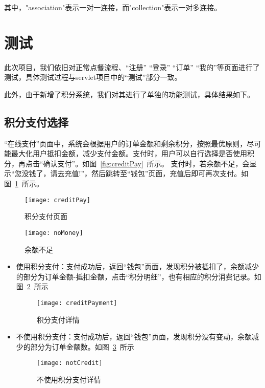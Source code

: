 其中，"association"表示一对一连接，而"collection"表示一对多连接。

\section{测试}
此次项目，我们依旧对正常点餐流程、“注册” “登录” “订单” “我的”等页面进行了测试，具体测试过程与servlet项目中的“测试”部分一致。

此外，由于新增了积分系统，我们对其进行了单独的功能测试，具体结果如下。~\\
\subsection{积分支付选择}
“在线支付”页面中，系统会根据用户的订单金额和剩余积分，按照最优原则，尽可能最大化用户抵扣金额，减少支付金额。支付时，用户可以自行选择是否使用积分，再点击“确认支付”。如图~\ref{fig:creditPay}~所示。
支付时，若余额不足，会显示“您没钱了，请去充值!”，然后跳转至“钱包”页面，充值后即可再次支付。如图~\ref{fig:noMoney}~所示。~\\
\begin{figure}[htbp]
    \centering
    \begin{minipage}{0.4\textwidth}
        \centering
        \texttt{[image: creditPay]}
        \caption{积分支付页面}\label{fig:creditPay}
    \end{minipage}
    \begin{minipage}{0.4\textwidth}
        \centering
        \texttt{[image: noMoney]}
        \caption{余额不足}\label{fig:noMoney}
    \end{minipage}
    \vspace{\baselineskip}
\end{figure}
\begin{itemize}
    \item {使用积分支付}：支付成功后，返回“钱包”页面，发现积分被抵扣了，余额减少的部分为订单金额-抵扣金额，点击“积分明细”，也有相应的积分消费记录。如图~\ref{fig:creditPayment}~所示~\\
    \begin{figure}[htbp]
        \centering
        \texttt{[image: creditPayment]}
        \caption{积分支付详情}\label{fig:creditPayment}
        \vspace{\baselineskip}
    \end{figure}

    \item {不使用积分支付}：支付成功后，返回“钱包”页面，发现积分没有变动，余额减少的部分为订单金额数。如图~\ref{fig:notCredit}~所示~\\
    \begin{figure}[htbp]
        \centering
        \texttt{[image: notCredit]}
        \caption{不使用积分支付详情}\label{fig:notCredit}
        \vspace{\baselineskip}
    \end{figure}
\end{itemize}
